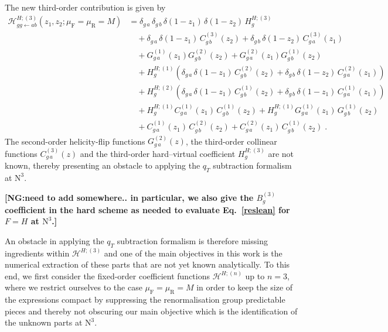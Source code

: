 \documentclass[12pt]{article}
\DeclareRobustCommand{\nn}{\nonumber}
\DeclareRobustCommand{\NG}[1]{\textbf{\quad\color{blue}[NG:\quad #1]}\xspace}
\DeclareRobustCommand{\mur}{\ensuremath{\mu_{\mathrm{R}}}\xspace}
\DeclareRobustCommand{\muf}{\ensuremath{\mu_{\mathrm{F}}}\xspace}
\DeclareRobustCommand{\qt}{\ensuremath{q_T}\xspace}
\DeclareRobustCommand{\cH}{\ensuremath{\mathcal{H}}}
\DeclareRobustCommand{\LO}{\text{LO}\xspace}
\DeclareRobustCommand{\N}[1]{\ensuremath{\text{N}^{#1}}} %
\begin{document}
The new third-order contribution is given by
\begin{align}
  \cH^{H;(3)}_{gg\gets ab}(z_1,z_2; \muf=\mur=M)
  &=
  \delta_{g\,a} \,\delta_{g\,b} \,\delta(1-z_1)\,\delta(1-z_2)\,H^{H;(3)}_g
  \nn\\&\quad
  +\delta_{g\,a} \,\delta(1-z_1)\,C^{(3)}_{g\,b}(z_2)
  +\delta_{g\,b} \,\delta(1-z_2)\,C^{(3)}_{g\,a}(z_1)
  \nn\\&\quad
  +G^{(1)}_{g\,a}(z_1) G^{(2)}_{g\,b}(z_2)
  +G^{(2)}_{g\,a}(z_1) G^{(1)}_{g\,b}(z_2)
  \nn\\&\quad
  +H^{H;(1)}_g\left(
  \delta_{g\,a} \,\delta(1-z_1) \,C^{(2)}_{g\,b}(z_2) +
  \delta_{g\,b} \,\delta(1-z_2) \,C^{(2)}_{g\,a}(z_1)
  \right) 
  \nn\\&\quad
  +H^{H;(2)}_g\left(
  \delta_{g\,a} \,\delta(1-z_1) \,C^{(1)}_{g\,b}(z_2) +
  \delta_{g\,b} \,\delta(1-z_1) \,C^{(1)}_{g\,a}(z_1)
  \right)
  \nn\\&\quad
  + H^{H;(1)}_g  C^{(1)}_{g\,a}(z_1) \, C^{(1)}_{g\,b}(z_2) 
  + H^{H;(1)}_g  G^{(1)}_{g\,a}(z_1) \, G^{(1)}_{g\,b}(z_2) 
  \nn\\&\quad
  + C^{(1)}_{g\,a}(z_1) \, C^{(2)}_{g\,b}(z_2)
  + C^{(2)}_{g\,a}(z_1) \, C^{(1)}_{g\,b}(z_2) \;.
  \label{H3}
\end{align}
The second-order helicity-flip functions $G^{(2)}_{g\,a}(z)$, the third-order collinear functions $C^{(3)}_{g\,a}(z)$ and the third-order hard--virtual coefficient $H^{H;(3)}_g$ are not known, thereby presenting an obstacle to applying the $\qt$ subtraction formalism 
at \N3\LO.

\NG{need to add somewhere.. 
in particular, we also give the $B_g^{(3)}$ coefficient in the hard scheme as needed to evaluate Eq.~\eqref{reslean} for $F=H$ at \N3\LO.}

{\color{black!30}
An obstacle in applying the $\qt$ subtraction formalism  is therefore missing ingredients within $\cH^{H;(3)}$ and one of the main objectives in this work is the numerical extraction of these parts that are not yet known analytically.
To this end, we first consider the fixed-order coefficient functions $\cH^{H;(n)}$ up to $n=3$, where we restrict ourselves to the case $\muf=\mur=M$ in order to keep the size of the expressions compact by suppressing the renormalisation group predictable pieces and thereby not obscuring our main objective which is the identification of the unknown parts at \N3\LO.
}
\end{document}
